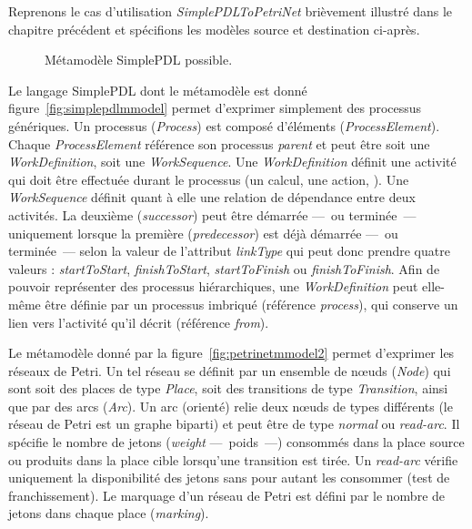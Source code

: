 Reprenons le cas d'utilisation \emph{SimplePDLToPetriNet} brièvement illustré
dans le chapitre précédent et spécifions les modèles source et destination
ci-après.

\begin{figure}[h]%
  \begin{center}
    
    \caption{Métamodèle SimplePDL possible.}
    \label{fig:simplesimplepdlmmodel}
  \end{center}
\end{figure}

Le langage SimplePDL dont le métamodèle est donné
figure~\ref{fig:simplepdlmmodel} permet d'exprimer simplement des processus
génériques. Un processus (\emph{Process}) est composé d'éléments
(\emph{ProcessElement}). Chaque \emph{ProcessElement} référence son processus
\emph{parent} et peut être soit une \emph{WorkDefinition}, soit une
\emph{WorkSequence}. Une \emph{WorkDefinition} définit une activité qui doit
être effectuée durant le processus (un calcul, une action, {\etc}). Une
\emph{WorkSequence} définit quant à elle une relation de dépendance entre deux
activités. La deuxième (\emph{successor}) peut être démarrée ---~ou
terminée~--- uniquement lorsque la première (\emph{predecessor}) est déjà
démarrée ---~ou terminée~--- selon la valeur de l'attribut \emph{linkType} qui
peut donc prendre quatre valeurs : \emph{startToStart}, \emph{finishToStart},
\emph{startToFinish} ou \emph{finishToFinish}. Afin de pouvoir représenter des
processus hiérarchiques, une \emph{WorkDefinition} peut elle-même être définie
par un processus imbriqué (référence \emph{process}), qui conserve un lien vers
l'activité qu'il décrit (référence \emph{from}).

Le métamodèle donné par la figure~\ref{fig:petrinetmmodel2} permet d'exprimer
les réseaux de Petri. Un tel réseau se définit par un ensemble de nœuds
(\emph{Node}) qui sont soit des places de type \emph{Place}, soit des
transitions de type \emph{Transition}, ainsi que par des arcs (\emph{Arc}). Un
arc (orienté) relie deux nœuds de types différents (le réseau de Petri est un
graphe biparti) et peut être de type \emph{normal} ou \emph{read-arc}. Il
spécifie le nombre de jetons (\emph{weight} ---~poids~---) consommés dans la
place source ou produits dans la place cible lorsqu'une transition est tirée.
Un \emph{read-arc} vérifie uniquement la disponibilité des jetons sans pour
autant les consommer (test de franchissement). Le marquage d'un réseau de Petri
est défini par le nombre de jetons dans chaque place (\emph{marking}).

